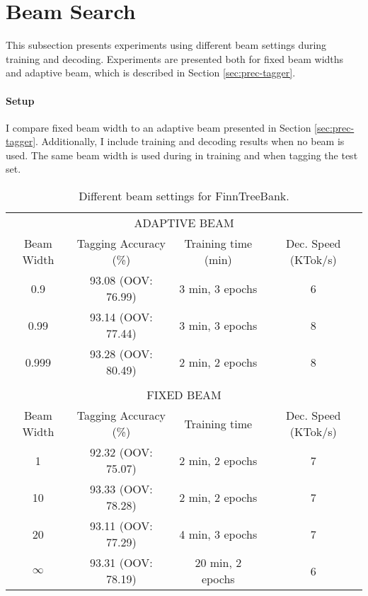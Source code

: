 \section{Beam Search}
This subsection presents experiments using different beam settings
during training and decoding. Experiments are presented both for fixed
beam widths and adaptive beam, which is described in Section
\ref{sec:prec-tagger}.

\paragraph{Setup} I compare fixed beam width to an adaptive beam
presented in Section \ref{sec:prec-tagger}. Additionally, I include
training and decoding results when no beam is used. The same beam
width is used during in training and when tagging the test set.

\begin{table}[htb!]
\begin{center}
\begin{tabular}{c|c|c|c}
\multicolumn{4}{c}{{\small\uppercase{Adaptive Beam}}}\\
\noalign{\smallskip}
\hline
Beam Width & Tagging Accuracy (\%) & Training time (min) & Dec. Speed (KTok/s)\\
\hline
0.9\phantom{99}        & 93.08 (OOV: 76.99)           & 3 min, 3 epochs & 6           \\
0.99\phantom{9}       & 93.14 (OOV: 77.44)           & 3 min, 3 epochs & 8            \\
0.999      & 93.28 (OOV: 80.49)           & 2 min, 2 epochs & 8            \\
\multicolumn{4}{c}{ }\\%
\multicolumn{4}{c}{{\small\uppercase{Fixed Beam}}}\\
\noalign{\smallskip}
\hline
Beam Width & Tagging Accuracy (\%) & Training time & Dec. Speed (KTok/s) \\
\hline
1\phantom{0}        & 92.32 (OOV: 75.07)            & 2 min, 2 epochs & 7          \\
10       & 93.33 (OOV: 78.28)           & 2 min, 2 epochs &  7            \\
20       & 93.11 (OOV: 77.29)           & 4 min, 3 epochs &  7             \\
$\infty$ & 93.31 (OOV: 78.19)           & 20 min, 2 epochs            & 6            \\
\end{tabular}
\caption{Different beam settings for FinnTreeBank.}
\end{center}
\end{table}

